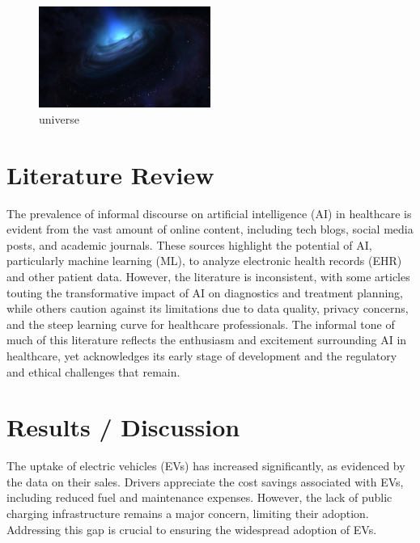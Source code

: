 \documentclass[conference]{IEEEtran}
\begin{document}
\begin{figure}[h]
\centering
\includegraphics[width=0.5\textwidth]{..//uploads/1740632573014.jpg}
\caption{universe}
\end{figure}
  



  \section{Literature Review}
  The prevalence of informal discourse on artificial intelligence (AI) in healthcare is evident from the vast amount of online content, including tech blogs, social media posts, and academic journals. These sources highlight the potential of AI, particularly machine learning (ML), to analyze electronic health records (EHR) and other patient data. However, the literature is inconsistent, with some articles touting the transformative impact of AI on diagnostics and treatment planning, while others caution against its limitations due to data quality, privacy concerns, and the steep learning curve for healthcare professionals. The informal tone of much of this literature reflects the enthusiasm and excitement surrounding AI in healthcare, yet acknowledges its early stage of development and the regulatory and ethical challenges that remain.





  \section{Results / Discussion}
  The uptake of electric vehicles (EVs) has increased significantly, as evidenced by the data on their sales. Drivers appreciate the cost savings associated with EVs, including reduced fuel and maintenance expenses. However, the lack of public charging infrastructure remains a major concern, limiting their adoption. Addressing this gap is crucial to ensuring the widespread adoption of EVs.
\end{document}
